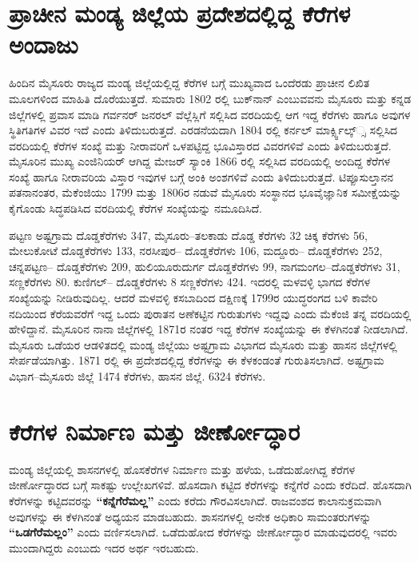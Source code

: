 \section{ಪ್ರಾಚೀನ ಮಂಡ್ಯ ಜಿಲ್ಲೆಯ ಪ್ರದೇಶದಲ್ಲಿದ್ದ ಕೆರೆಗಳ ಅಂದಾಜು}

ಹಿಂದಿನ ಮೈಸೂರು ರಾಜ್ಯದ ಮಂಡ್ಯ ಜಿಲ್ಲೆಯಲ್ಲಿದ್ದ ಕೆರೆಗಳ ಬಗ್ಗೆ ಮುಖ್ಯವಾದ ಒಂದೆರಡು ಪ್ರಾಚೀನ ಲಿಖಿತ ಮೂಲಗಳಿಂದ ಮಾಹಿತಿ ದೊರೆಯುತ್ತದೆ. ಸುಮಾರು 1802 ರಲ್ಲಿ ಬುಕ್​ನಾನ್​ ಎಂಬುವವನು ಮೈಸೂರು ಮತ್ತು ಕನ್ನಡ ಜಿಲ್ಲೆಗಳಲ್ಲಿ ಪ್ರವಾಸ ಮಾಡಿ ಗರ್ವನರ್​ ಜನರಲ್​ ವೆಲ್ಲೆಸ್ಲಿಗೆ ಸಲ್ಲಿಸಿದ ವರದಿಯಲ್ಲಿ ಆಗ ಇದ್ದ ಕೆರೆಗಳು ಹಾಗೂ ಅವುಗಳ ಸ್ಥಿತಿಗತಿಗಳ ವಿವರ ಇದೆ ಎಂದು ತಿಳಿದುಬರುತ್ತದೆ. ಎರಡನೆಯದಾಗಿ 1804 ರಲ್ಲಿ ಕರ್ನಲ್​ ಮಾರ್ಕ್ಸ್ವಿಲ್ಕ್​್ಸ ಸಲ್ಲಿಸಿದ ವರದಿಯಲ್ಲಿ ಕೆರೆಗಳ ಸಂಖ್ಯೆ ಮತ್ತು ನೀರಾವರಿಗೆ ಒಳಪಟ್ಟಿದ್ದ ಭೂವಿಸ್ತಾರದ ವಿವರಗಳಿವೆ ಎಂದು ತಿಳಿದುಬರುತ್ತದೆ. ಮೈಸೂರಿನ ಮುಖ್ಯ ಎಂಜಿನಿಯರ್​ ಆಗಿದ್ದ ಮೇಜರ್​ ಸ್ಯಾಂಕಿ 1866 ರಲ್ಲಿ ಸಲ್ಲಿಸಿದ ವರದಿಯಲ್ಲಿ ಅಂದಿದ್ದ ಕೆರೆಗಳ ಸಂಖ್ಯೆ ಹಾಗೂ ನೀರಾವರಿಯ ವಿಸ್ತಾರ ಇವುಗಳ ಬಗ್ಗೆ ಅಂಕಿ ಅಂಶಗಳಿವೆ ಎಂದು ತಿಳಿದುಬರುತ್ತದೆ. ಟಿಪ್ಪೂಸುಲ್ತಾನನ ಪತನಾನಂತರ, ಮೆಕೆಂಜಿಯು 1799 ಮತ್ತು 1806ರ ನಡುವೆ ಮೈಸೂರು ಸಂಸ್ಥಾನದ ಭೂವೈಜ್ಞಾನಿಕ ಸಮೀಕ್ಷೆಯನ್ನು ಕೈಗೊಂಡು ಸಿದ್ಧಪಡಿಸಿದ ವರದಿಯಲ್ಲಿ ಕೆರೆಗಳ ಸಂಖ್ಯೆಯನ್ನು ನಮೂದಿಸಿದೆ.

ಪಟ್ಟಣ ಅಷ್ಟಗ್ರಾಮ  ದೊಡ್ಡಕೆರೆಗಳು 347, ಮೈಸೂರು–ತಲಕಾಡು ದೊಡ್ಡ ಕೆರೆಗಳು 32 ಚಿಕ್ಕ ಕೆರೆಗಳು 56, ಮೇಲುಕೋಟೆ  ದೊಡ್ಡಕೆರೆಗಳು 133, ನರಸೀಪುರ– ದೊಡ್ಡಕೆರೆಗಳು 106, ಮದ್ದೂರು– ದೊಡ್ಡಕೆರೆಗಳು 252, ಚನ್ನಪಟ್ಟಣ– ದೊಡ್ಡಕೆರೆಗಳು 209, ಹುಲಿಯೂರುದುರ್ಗ ದೊಡ್ಡಕೆರೆಗಳು 99, ನಾಗಮಂಗಲ–ದೊಡ್ಡಕೆರೆಗಳು 31, ಸಣ್ಣಕೆರೆಗಳು 80. ಕುಣಿಗಲ್​– ದೊಡ್ಡಕೆರೆಗಳು 8 ಸಣ್ಣಕೆರೆಗಳು 424. ಇದರಲ್ಲಿ ಮಳವಳ್ಳಿ ಭಾಗದ ಕೆರೆಗಳ ಸಂಖ್ಯೆಯನ್ನು ನೀಡಿರುವುದಿಲ್ಲ. ಆದರೆ ಮಳವಳ್ಳಿ ಕಸಬಾದಿಂದ ದಕ್ಷಿಣಕ್ಕೆ 1799ರ ಯುದ್ಧರಂಗದ ಬಳಿ ಕಾವೇರಿ ನದಿಯಿಂದ ಕೆರೆಯವರೆಗೆ ಇದ್ದ ಒಂದು ಪುರಾತನ ಅಣೆಕಟ್ಟಿನ ಗುರುತುಗಳು ಇದ್ದವು ಎಂದು ಮೆಕೆಂಜಿ ತನ್ನ ವರದಿಯಲ್ಲಿ ಹೇಳಿದ್ದಾನೆ. ಮೈಸೂರಿನ ನಾನಾ ಜಿಲ್ಲೆಗಳಲ್ಲಿ 1871ರ ನಂತರ ಇದ್ದ ಕೆರೆಗಳ ಸಂಖ್ಯೆಯನ್ನು ಈ ಕೆಳಗಿನಂತೆ ನೀಡಲಾಗಿದೆ. ಮೈಸೂರು ಒಡೆಯರ ಆಡಳಿತದಲ್ಲಿ ಮಂಡ್ಯ ಜಿಲ್ಲೆಯು ಅಷ್ಟಗ್ರಾಮ ವಿಭಾಗದ ಮೈಸೂರು ಮತ್ತು ಹಾಸನ ಜಿಲ್ಲೆಗಳಲ್ಲಿ ಸೇರ್ಪಡೆಯಾಗಿತ್ತು. 1871 ರಲ್ಲಿ ಈ ಪ್ರದೇಶದಲ್ಲಿದ್ದ ಕೆರೆಗಳನ್ನು ಈ ಕೆಳಕಂಡಂತೆ ಗುರುತಿಸಲಾಗಿದೆ. ಅಷ್ಟಗ್ರಾಮ ವಿಭಾಗ–ಮೈಸೂರು ಜಿಲ್ಲೆ 1474 ಕೆರೆಗಳು, ಹಾಸನ ಜಿಲ್ಲೆ. 6324 ಕೆರೆಗಳು.


\section{ಕೆರೆಗಳ ನಿರ್ಮಾಣ ಮತ್ತು ಜೀರ್ಣೋದ್ಧಾರ}

ಮಂಡ್ಯ ಜಿಲ್ಲೆಯಲ್ಲಿ ಶಾಸನಗಳಲ್ಲಿ ಹೊಸಕೆರೆಗಳ ನಿರ್ಮಾಣ ಮತ್ತು ಹಳೆಯ, ಒಡೆದುಹೋಗಿದ್ದ ಕೆರೆಗಳ ಜೀರ್ಣೋದ್ಧಾರದ ಬಗ್ಗೆ ಸಾಕಷ್ಟು ಉಲ್ಲೇಖಗಳಿವೆ. ಹೊಸದಾಗಿ ಕಟ್ಟಿದ ಕೆರೆಗಳನ್ನು ಕನ್ನೆಗೆರೆ ಎಂದು ಕರೆದಿದೆ. ಹೊಸದಾಗಿ ಕೆರೆಗಳನ್ನು ಕಟ್ಟಿದವರನ್ನು \textbf{“ಕನ್ನೆಗೆರೆಮಲ್ಲ”} ಎಂದು ಕರೆದು ಗೌರವಿಸಲಾಗಿದೆ. ರಾಜವಂಶದ ಕಾಲಾನುಕ್ರಮವಾಗಿ ಅವುಗಳನ್ನು ಈ ಕೆಳಗಿನಂತೆ ಅಧ್ಯಯನ ಮಾಡಬಹುದು. ಶಾಸನಗಳಲ್ಲಿ ಅನೇಕ ಅಧಿಕಾರಿ ಸಾಮಂತರುಗಳನ್ನು \textbf{“ಒಡಗೆರೆಮಲ್ಲಂ”} ಎಂದು ವರ್ಣಿಸಲಾಗಿದೆ. ಒಡೆದುಹೋದ ಕೆರೆಗಳನ್ನು ಜೀರ್ಣೋದ್ಧಾರ ಮಾಡುವುದರಲ್ಲಿ ಇವರು ಮುಂದಾಗಿದ್ದರು ಎಂಬುದು ಇದರ ಅರ್ಥ ಇರಬಹುದು.

